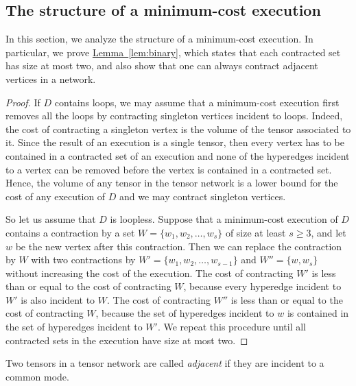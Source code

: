 \documentclass[11pt]{article}
\numberwithin{equation}{section}
\theoremstyle{definition}
\theoremstyle{plain}
\newcommand{\expref}[2]{\hyperref[#2]{#1~\ref{#2}}}
\begin{document}
\subsection{The structure of a minimum-cost execution} \label{sect:structure_min_cost_execution}

In this section, we analyze the structure of a minimum-cost execution. In particular, we prove \expref{Lemma}{lem:binary}, which states that each contracted set has size at most two, and also show that one can always contract adjacent vertices in a network.

\BinaryExecutionLemma* \label{lem:binary_appendix}

\begin{proof}
If $D$ contains loops, we may assume that
a minimum-cost execution first removes all the loops by contracting singleton
vertices incident to loops. Indeed, the cost of contracting
a singleton vertex is the volume of the tensor associated to it. Since the result of an execution is a single tensor, then every vertex has to be contained in a contracted set of an execution and none of the hyperedges incident to a vertex can be removed before the vertex is contained in a contracted set. Hence, the volume of any tensor in the tensor network is a lower
bound for the cost of any execution of $D$ and we may contract singleton vertices.

So let us assume that $D$ is loopless.
Suppose that a minimum-cost execution of $D$ contains a contraction by
a set $W=\{w_1,w_2,\ldots,w_s\}$ of size at least $s\geq 3$, and let $w$ be the new vertex after this contraction. Then we can replace the contraction by $W$ with
two contractions by $W'=\{w_1,w_2,\ldots,w_{s-1}\}$ and $W''=\{w,w_s\}$ without increasing the
cost of the execution. The cost of contracting $W'$ is less than or equal to the cost of contracting $W$, because every hyperedge incident to $W'$ is also incident to $W$. The cost of contracting $W''$ is less than or equal to the cost of contracting $W$, because the set of hyperedges incident to $w$ is contained in the set of hyperedges incident to $W'$. We repeat this procedure until all contracted sets in the
execution have size at most two.
\end{proof}

Two tensors in a tensor network are called \emph{adjacent}
if they are incident to a common mode.
\end{document}
